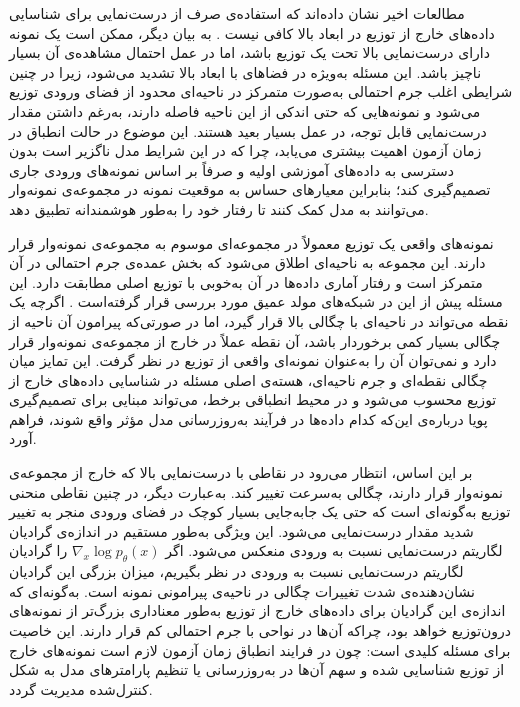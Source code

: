 
مطالعات اخیر نشان داده‌اند که استفاده‌ی صرف از درست‌نمایی برای شناسایی داده‌های خارج از توزیع در ابعاد بالا کافی نیست \cite{Nalisnick2019}. 
به بیان دیگر، ممکن است یک نمونه دارای درست‌نمایی بالا تحت یک توزیع باشد، 
اما در عمل احتمال مشاهده‌ی آن بسیار ناچیز باشد. 
این مسئله به‌ویژه در فضاهای با ابعاد بالا تشدید می‌شود، 
زیرا در چنین شرایطی اغلب جرم احتمالی به‌صورت متمرکز در ناحیه‌ای محدود از فضای ورودی توزیع می‌شود 
و نمونه‌هایی که حتی اندکی از این ناحیه فاصله دارند، 
به‌رغم داشتن مقدار درست‌نمایی قابل توجه، در عمل بسیار بعید هستند.  
این موضوع در حالت انطباق در زمان آزمون اهمیت بیشتری می‌یابد، 
چرا که در این شرایط مدل ناگزیر است بدون دسترسی به داده‌های آموزشی اولیه 
و صرفاً بر اساس نمونه‌های ورودی جاری تصمیم‌گیری کند؛
بنابراین معیارهای حساس به موقعیت نمونه در {مجموعه‌ی نمونه‌وار} 
می‌توانند به مدل کمک کنند تا رفتار خود را به‌طور هوشمندانه تطبیق دهد.  

نمونه‌های واقعی یک توزیع معمولاً در مجموعه‌ای موسوم به مجموعه‌ی نمونه‌وار قرار دارند. 
این مجموعه به ناحیه‌ای اطلاق می‌شود که بخش عمده‌ی جرم احتمالی در آن متمرکز است 
و رفتار آماری داده‌ها در آن به‌خوبی با توزیع اصلی مطابقت دارد.
این مسئله پیش از این در شبکه‌های مولد عمیق مورد بررسی قرار گرفته‌است \cite{typicality}.
اگرچه یک نقطه می‌تواند در ناحیه‌ای با چگالی بالا قرار گیرد، 
اما در صورتی‌که پیرامون آن ناحیه از چگالی بسیار کمی برخوردار باشد، 
آن نقطه عملاً در خارج از مجموعه‌ی نمونه‌وار قرار دارد 
و نمی‌توان آن را به‌عنوان نمونه‌ای واقعی از توزیع در نظر گرفت.  
این تمایز میان چگالی نقطه‌ای و جرم ناحیه‌ای، هسته‌ی اصلی مسئله در شناسایی داده‌های خارج از توزیع محسوب می‌شود 
و در محیط انطباقی برخط، می‌تواند مبنایی برای تصمیم‌گیری پویا درباره‌ی این‌که کدام داده‌ها 
در فرآیند به‌روزرسانی مدل مؤثر واقع شوند، فراهم آورد.  

بر این اساس، انتظار می‌رود در نقاطی با درست‌نمایی بالا که خارج از مجموعه‌ی نمونه‌وار قرار دارند، 
چگالی به‌سرعت تغییر کند. 
به‌عبارت دیگر، در چنین نقاطی منحنی توزیع به‌گونه‌ای است که حتی یک جابه‌جایی بسیار کوچک در فضای ورودی منجر به تغییر شدید مقدار درست‌نمایی می‌شود. 
این ویژگی به‌طور مستقیم در اندازه‌ی گرادیان لگاریتم درست‌نمایی نسبت به ورودی منعکس می‌شود.  
اگر $\nabla_x \log p_\theta(x)$ را گرادیان لگاریتم درست‌نمایی نسبت به ورودی در نظر بگیریم، 
میزان بزرگی این گرادیان نشان‌دهنده‌ی شدت تغییرات چگالی در ناحیه‌ی پیرامونی نمونه است.  
به‌گونه‌ای که اندازه‌ی این گرادیان برای داده‌های خارج از توزیع 
به‌طور معناداری بزرگ‌تر از نمونه‌های درون‌توزیع خواهد بود، 
چراکه آن‌ها در نواحی با جرم احتمالی کم قرار دارند.  
این خاصیت برای مسئله‌ کلیدی است: 
چون در فرایند انطباق زمان آزمون لازم است نمونه‌های خارج از توزیع شناسایی شده 
و سهم آن‌ها در به‌روزرسانی یا تنظیم پارامترهای مدل به شکل کنترل‌شده مدیریت گردد.  

